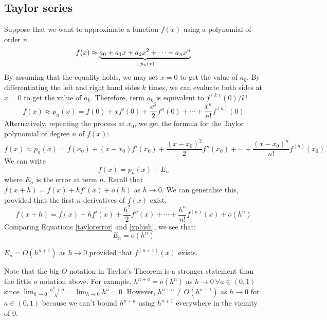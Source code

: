 \subsection{Taylor series}
Suppose that we want to approximate a function \(f(x)\) using a polynomial of order \(n\).
\[
	f(x) \approx \underbrace{a_0 + a_1 x + a_2 x^2 + \cdots + a_n x^n}_{\mathclap{\equiv p_n(x)}}
\]
By assuming that the equality holds, we may set \(x=0\) to get the value of \(a_0\).
By differentiating the left and right hand sides \(k\) times, we can evaluate both sides at \(x=0\) to get the value of \(a_k\).
Therefore, term \(a_k\) is equivalent to \(f^{(k)}(0)/k!
\)
\[
	f(x) \approx p_n(x) = f(0) + xf'(0) + \frac{x^2}{2}f''(0) + \cdots + \frac{x^n}{n!}f^{(n)}(0)
\]
Alternatively, repeating the process at \(x_0\), we get the formula for the Taylor polynomial of degree \(n\) of \(f(x)\):
\[
	f(x) \approx p_n(x) = f(x_0) + (x-x_0)f'(x_0) + \frac{(x-x_0)^2}{2}f''(x_0) + \cdots + \frac{(x-x_0)^n}{n!}f^{(n)}(x_0)
\]
We can write
\begin{equation}\label{taylorerror}
	f(x) = p_n(x) + E_n
\end{equation}
where \(E_n\) is the error at term \(n\).
Recall that \(f(x+h) = f(x) + hf'(x) + o(h)\) as \(h \to 0\).
We can generalise this, provided that the first \(n\) derivatives of \(f(x)\) exist.
\begin{equation}\label{xplush}
	f(x+h) = f(x) + hf'(x) + \frac{h^2}{2}f''(x) + \cdots + \frac{h^n}{n!}f^{(n)}(x) + o(h^n)
\end{equation}
Comparing Equations \eqref{taylorerror} and \eqref{xplush}, we see that:
\[
	E_n = o(h^n)
\]
\begin{theorem}
	\(E_n = O(h^{n+1})\) as \(h \to 0\) provided that \(f^{(n+1)}(x)\) exists.
\end{theorem}
Note that the big \(O\) notation in Taylor's Theorem is a stronger statement than the little \(o\) notation above.
For example, \(h^{n+a}=o(h^n)\) as \(h \to 0\ \forall a \in (0, 1)\) since \(\lim_{h\to 0} \frac{h^n+a}{h^n} = \lim_{h\to 0} h^a = 0\).
However, \(h^{n+a} \neq O(h^{n+1})\) as \(h \to 0\) for \(a \in (0, 1)\) because we can't bound \(h^{n+a}\) using \(h^{n+1}\) everywhere in the vicinity of \(0\).

